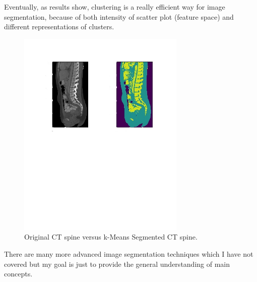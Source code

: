 Eventually, as results show, clustering is a really efficient way for image segmentation, because of both intensity of scatter plot (feature space) and different representations of clusters.

\newpage
\begin{figure}[h]
    \centering \includegraphics[width=8cm]{images/ct-spine-k-means-segmented.jpg}
    \vspace*{-50mm} \caption {Original CT spine versus k-Means Segmented CT spine.}
\end{figure}

There are many more advanced image segmentation techniques which I have not covered but my goal is just to provide the general understanding of main concepts.  


